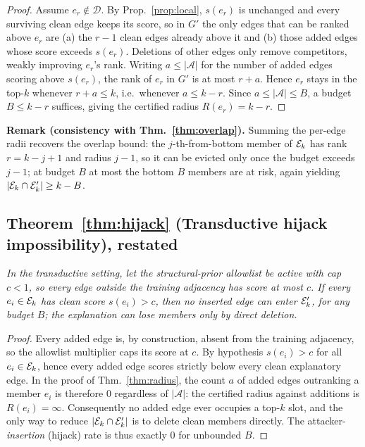 \begin{proof}
Assume $e_r\notin\mathcal{D}$. By Prop.~\ref{prop:local}, $s(e_r)$ is unchanged
and every surviving clean edge keeps its score, so in $G'$ the only edges that
can be ranked above $e_r$ are (a) the $r-1$ clean edges already above it and (b)
those added edges whose score exceeds $s(e_r)$. Deletions of other edges only
remove competitors, weakly improving $e_r$'s rank. Writing $a\le|\mathcal{A}|$
for the number of added edges scoring above $s(e_r)$, the rank of $e_r$ in $G'$
is at most $r+a$. Hence $e_r$ stays in the top-$k$ whenever $r+a\le k$, i.e.\
whenever $a\le k-r$. Since $a\le|\mathcal{A}|\le B$, a budget $B\le k-r$
suffices, giving the certified radius $R(e_r)=k-r$.
\end{proof}

\noindent\textbf{Remark (consistency with Thm.~\ref{thm:overlap}).} Summing the
per-edge radii recovers the overlap bound: the $j$-th-from-bottom member of
$\mathcal{E}_k$ has rank $r=k-j+1$ and radius $j-1$, so it can be evicted only once the
budget exceeds $j-1$; at budget $B$ at most the bottom $B$ members are at risk,
again yielding $|\mathcal{E}_k\cap\mathcal{E}_k'|\ge k-B$.

\subsection*{Theorem~\ref{thm:hijack} (Transductive hijack impossibility), restated}
\emph{In the transductive setting, let the structural-prior allowlist be active
with cap $c<1$, so every edge outside the training adjacency has score at most
$c$. If every $e_i\in\mathcal{E}_k$ has clean score $s(e_i)>c$, then no inserted edge can
enter $\mathcal{E}_k'$, for any budget $B$; the explanation can lose members only by
direct deletion.}

\begin{proof}
Every added edge is, by construction, absent from the training adjacency, so the
allowlist multiplier caps its score at $c$. By hypothesis $s(e_i)>c$ for all
$e_i\in\mathcal{E}_k$, hence every added edge scores strictly below every clean
explanatory edge. In the proof of Thm.~\ref{thm:radius}, the count $a$ of added
edges outranking a member $e_i$ is therefore $0$ regardless of $|\mathcal{A}|$:
the certified radius against additions is $R(e_i)=\infty$. Consequently no added
edge ever occupies a top-$k$ slot, and the only way to reduce $|\mathcal{E}_k\cap\mathcal{E}_k'|$ is
to delete clean members directly. The attacker-\emph{insertion} (hijack) rate is
thus exactly $0$ for unbounded $B$.
\end{proof}

